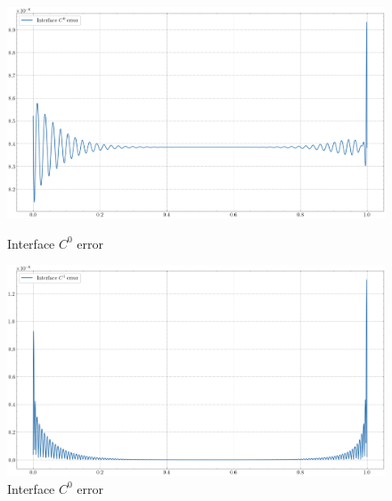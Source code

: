 \begin{figure}[!htb]
    \centering
    \begin{minipage}{.5\textwidth}
      \centering
      \includegraphics[width=1\linewidth]{Images/Transmission/L_shape_2_axis_c0_error_k1_2_enr.png}
      \caption{Interface \(C^0\) error}
      \label{transmission_L_axis_error_c0_k1_2}
    \end{minipage}%
    \begin{minipage}{.5\textwidth}
      \centering
      \includegraphics[width=1\linewidth]{Images/Transmission/L_shape_2_axis_c1_error_k1_2_enr.png}
      \caption{Interface \(C^0\) error}
      \label{transmission_L_axis_error_c1_k1_2}
    \end{minipage}
    
    \vspace{0.5cm} %
    

\end{figure}
